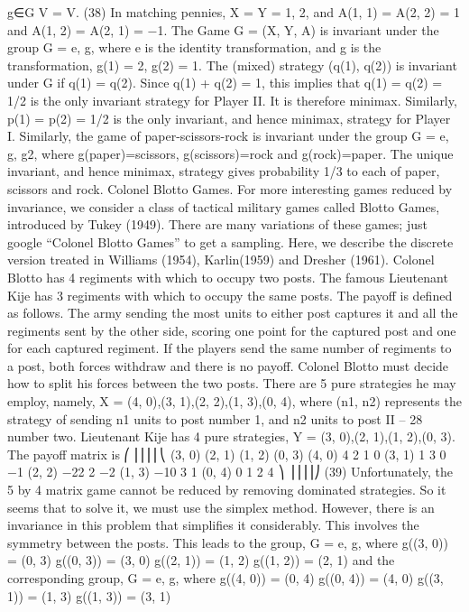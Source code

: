g∈G
V = V.
(38)
In matching pennies, X = Y = {1, 2}, and A(1, 1) = A(2, 2) = 1 and A(1, 2) =
A(2, 1) = −1. The Game G = (X, Y, A) is invariant under the group G = {e, g}, where e is
the identity transformation, and g is the transformation, g(1) = 2, g(2) = 1. The (mixed)
strategy (q(1), q(2)) is invariant under G if q(1) = q(2). Since q(1) + q(2) = 1, this implies
that q(1) = q(2) = 1/2 is the only invariant strategy for Player II. It is therefore minimax.
Similarly, p(1) = p(2) = 1/2 is the only invariant, and hence minimax, strategy for Player
I.
Similarly, the game of paper-scissors-rock is invariant under the group G = {e, g, g2},
where g(paper)=scissors, g(scissors)=rock and g(rock)=paper. The unique invariant, and
hence minimax, strategy gives probability 1/3 to each of paper, scissors and rock.
Colonel Blotto Games. For more interesting games reduced by invariance, we
consider a class of tactical military games called Blotto Games, introduced by Tukey
(1949). There are many variations of these games; just google “Colonel Blotto Games”
to get a sampling. Here, we describe the discrete version treated in Williams (1954),
Karlin(1959) and Dresher (1961).
Colonel Blotto has 4 regiments with which to occupy two posts. The famous Lieutenant
Kije has 3 regiments with which to occupy the same posts. The payoff is defined as
follows. The army sending the most units to either post captures it and all the regiments
sent by the other side, scoring one point for the captured post and one for each captured
regiment. If the players send the same number of regiments to a post, both forces withdraw
and there is no payoff.
Colonel Blotto must decide how to split his forces between the two posts. There are
5 pure strategies he may employ, namely, X = {(4, 0),(3, 1),(2, 2),(1, 3),(0, 4)}, where
(n1, n2) represents the strategy of sending n1 units to post number 1, and n2 units to post
II – 28
number two. Lieutenant Kije has 4 pure strategies, Y = {(3, 0),(2, 1),(1, 2),(0, 3)}. The
payoff matrix is
⎛
⎜⎜⎜⎜⎝
(3, 0) (2, 1) (1, 2) (0, 3)
(4, 0) 4 2 1 0
(3, 1) 1 3 0 −1
(2, 2) −22 2 −2
(1, 3) −10 3 1
(0, 4) 0 1 2 4
⎞
⎟⎟⎟⎟⎠
(39)
Unfortunately, the 5 by 4 matrix game cannot be reduced by removing dominated
strategies. So it seems that to solve it, we must use the simplex method. However, there is
an invariance in this problem that simplifies it considerably. This involves the symmetry
between the posts. This leads to the group, G = {e, g}, where
g((3, 0)) = (0, 3) g((0, 3)) = (3, 0) g((2, 1)) = (1, 2) g((1, 2)) = (2, 1)
and the corresponding group, G = {e, g}, where
g((4, 0)) = (0, 4) g((0, 4)) = (4, 0) g((3, 1)) = (1, 3) g((1, 3)) = (3, 1)
